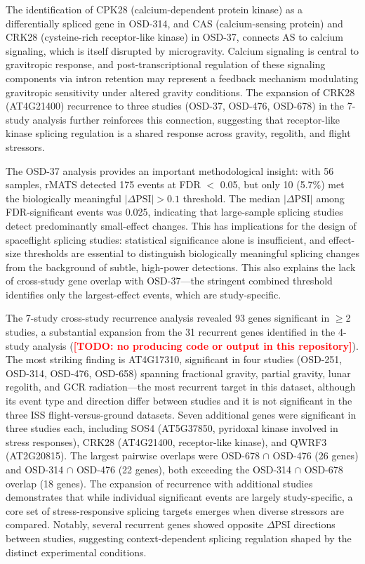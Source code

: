 \documentclass[12pt,a4paper]{article}
\newcommand{\TODO}[1]{\textcolor{red}{\textbf{[TODO: #1]}}}
\begin{document}
The identification of CPK28 (calcium-dependent protein kinase) as a differentially spliced gene in OSD-314, and CAS (calcium-sensing protein) and CRK28 (cysteine-rich receptor-like kinase) in OSD-37, connects AS to calcium signaling, which is itself disrupted by microgravity. Calcium signaling is central to gravitropic response, and post-transcriptional regulation of these signaling components via intron retention may represent a feedback mechanism modulating gravitropic sensitivity under altered gravity conditions. The expansion of CRK28 (AT4G21400) recurrence to three studies (OSD-37, OSD-476, OSD-678) in the 7-study analysis further reinforces this connection, suggesting that receptor-like kinase splicing regulation is a shared response across gravity, regolith, and flight stressors.

The OSD-37 analysis provides an important methodological insight: with 56 samples, rMATS detected 175 events at FDR $<$ 0.05, but only 10 (5.7\%) met the biologically meaningful $|\Delta\text{PSI}| > 0.1$ threshold. The median $|\Delta\text{PSI}|$ among FDR-significant events was 0.025, indicating that large-sample splicing studies detect predominantly small-effect changes. This has implications for the design of spaceflight splicing studies: statistical significance alone is insufficient, and effect-size thresholds are essential to distinguish biologically meaningful splicing changes from the background of subtle, high-power detections. This also explains the lack of cross-study gene overlap with OSD-37---the stringent combined threshold identifies only the largest-effect events, which are study-specific.

The 7-study cross-study recurrence analysis revealed 93 genes significant in $\geq$2 studies, a substantial expansion from the 31 recurrent genes identified in the 4-study analysis (\TODO{no producing code or output in this repository}). The most striking finding is AT4G17310, significant in four studies (OSD-251, OSD-314, OSD-476, OSD-658) spanning fractional gravity, partial gravity, lunar regolith, and GCR radiation---the most recurrent target in this dataset, although its event type and direction differ between studies and it is not significant in the three ISS flight-versus-ground datasets. Seven additional genes were significant in three studies each, including SOS4 (AT5G37850, pyridoxal kinase involved in stress responses), CRK28 (AT4G21400, receptor-like kinase), and QWRF3 (AT2G20815). The largest pairwise overlaps were OSD-678 $\cap$ OSD-476 (26 genes) and OSD-314 $\cap$ OSD-476 (22 genes), both exceeding the OSD-314 $\cap$ OSD-678 overlap (18 genes). The expansion of recurrence with additional studies demonstrates that while individual significant events are largely study-specific, a core set of stress-responsive splicing targets emerges when diverse stressors are compared. Notably, several recurrent genes showed opposite $\Delta$PSI directions between studies, suggesting context-dependent splicing regulation shaped by the distinct experimental conditions.
\end{document}
